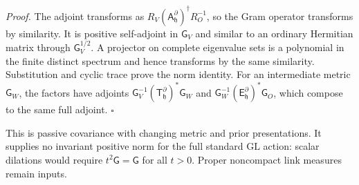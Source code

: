 \documentclass[11pt,letterpaper]{report}
\newcommand{\GL}{\mathrm{GL}}
\begin{document}
\noindent\emph{Proof.}
The adjoint transforms as $R_V(\mathsf A_{\mathfrak h}^\partial)^\dagger R_O^{-1}$, so the Gram operator transforms by similarity. It is positive self-adjoint in $\mathsf G_V$ and similar to an ordinary Hermitian matrix through $\mathsf G_V^{1/2}$. A projector on complete eigenvalue sets is a polynomial in the finite distinct spectrum and hence transforms by the same similarity. Substitution and cyclic trace prove the norm identity. For an intermediate metric $\mathsf G_W$, the factors have adjoints $\mathsf G_V^{-1}(\mathsf T_{\mathfrak h}^\partial)^*\mathsf G_W$ and $\mathsf G_W^{-1}(\mathsf E_{\mathfrak h}^\partial)^*\mathsf G_O$, which compose to the same full adjoint. $\square$

This is passive covariance with changing metric and prior presentations. It supplies no invariant positive norm for the full standard $\GL$ action: scalar dilations would require $t^2\mathsf G=\mathsf G$ for all $t>0$. Proper noncompact link measures remain inputs.
\end{document}
